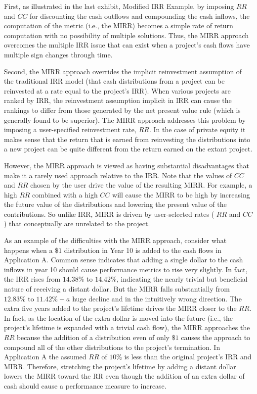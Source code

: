\documentclass[11pt]{article}
\begin{document}
First, as illustrated in the last exhibit, Modified IRR Example, by imposing $R R$ and $C C$ for discounting the cash outflows and compounding the cash inflows, the computation of the metric (i.e., the MIRR) becomes a simple rate of return computation with no possibility of multiple solutions. Thus, the MIRR approach overcomes the multiple IRR issue that can exist when a project's cash flows have multiple sign changes through time.

Second, the MIRR approach overrides the implicit reinvestment assumption of the traditional IRR model (that cash distributions from a project can be reinvested at a rate equal to the project's IRR). When various projects are ranked by IRR, the reinvestment assumption implicit in IRR can cause the rankings to differ from those generated by the net present value rule (which is generally found to be superior). The MIRR approach addresses this problem by imposing a user-specified reinvestment rate, $R R$. In the case of private equity it makes sense that the return that is earned from reinvesting the distributions into a new project can be quite different from the return earned on the extant project.

However, the MIRR approach is viewed as having substantial disadvantages that make it a rarely used approach relative to the IRR. Note that the values of $C C$ and $R R$ chosen by the user drive the value of the resulting MIRR. For example, a high $R R$ combined with a high $C C$ will cause the MIRR to be high by increasing the future value of the distributions and lowering the present value of the contributions. So unlike IRR, MIRR is driven by user-selected rates ( $R R$ and $C C$ ) that conceptually are unrelated to the project.

As an example of the difficulties with the MIRR approach, consider what happens when a $\$ 1$ distribution in Year 10 is added to the cash flows in Application A. Common sense indicates that adding a single dollar to the cash inflows in year 10 should cause performance metrics to rise very slightly. In fact, the IRR rises from $14.38 \%$ to $14.42 \%$, indicating the nearly trivial but beneficial nature of receiving a distant dollar. But the MIRR falls substantially from $12.83 \%$ to $11.42 \%-a$ huge decline and in the intuitively wrong direction. The extra five years added to the project's lifetime drives the MIRR closer to the $R R$. In fact, as the location of the extra dollar is moved into the future (i.e., the project's lifetime is expanded with a trivial cash flow), the MIRR approaches the $R R$ because the addition of a distribution even of only $\$ 1$ causes the approach to compound all of the other distributions to the project's termination. In Application A the assumed $R R$ of $10 \%$ is less than the original project's IRR and MIRR. Therefore, stretching the project's lifetime by adding a distant dollar lowers the MIRR toward the RR even though the addition of an extra dollar of cash should cause a performance measure to increase.
\end{document}
